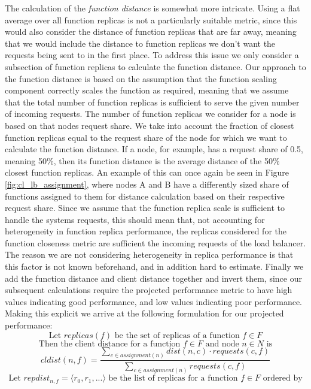 The calculation of the \textit{function distance} is somewhat more intricate.
Using a flat average over all function replicas is not a particularly suitable metric, since this would also consider the distance of function replicas that are far away, meaning that we would include the distance to function replicas we don't want the requests being sent to in the first place.
To address this issue we only consider a subsection of function replicas to calculate the function distance.
Our approach to the function distance is based on the assumption that the function scaling component correctly scales the function as required, meaning that we assume that the total number of function replicas is sufficient to serve the given number of incoming requests.
The number of function replicas we consider for a node is based on that nodes request share. We take into account the fraction of closest function replicas equal to the request share of the node for which we want to calculate the function distance.
If a node, for example, has a request share of 0.5, meaning 50\%, then its function distance is the average distance of the 50\% closest function replicas.
An example of this can once again be seen in Figure \ref{fig:cl_lb_assignment}, where nodes A and B have a differently sized share of functions assigned to them for distance calculation based on their respective request share.
Since we assume that the function replica scale is sufficient to handle the systems requests, this should mean that, not accounting for heterogeneity in function replica performance, the replicas considered for the function closeness metric are sufficient the incoming requests of the load balancer.
The reason we are not considering heterogeneity in replica performance is that this factor is not known beforehand, and in addition hard to estimate.
Finally we add the function distance and client distance together and invert them, since our subsequent calculations require the projected performance metric to have high values indicating good performance, and low values indicating poor performance.
Making this explicit we arrive at the following formulation for our projected performance:
\[\text{Let } replicas(f) \text{ be the set of replicas of a function }f \in F\]
\[\text{Then the client distance for a function }f \in F \text{ and node }n \in N \text{ is}\]
\[cldist(n,f) = \frac{\sum_{c \in assignment(n)}dist(n,c) \cdot requests(c,f)}{\sum_{c \in assignment(n)}requests(c,f)} \]
\[\text{Let }repdist_{n,f} = \langle r_{0}, r_{1}, ... \rangle \text{ be the list of replicas for a function }f \in F \text{ ordered by} \]

